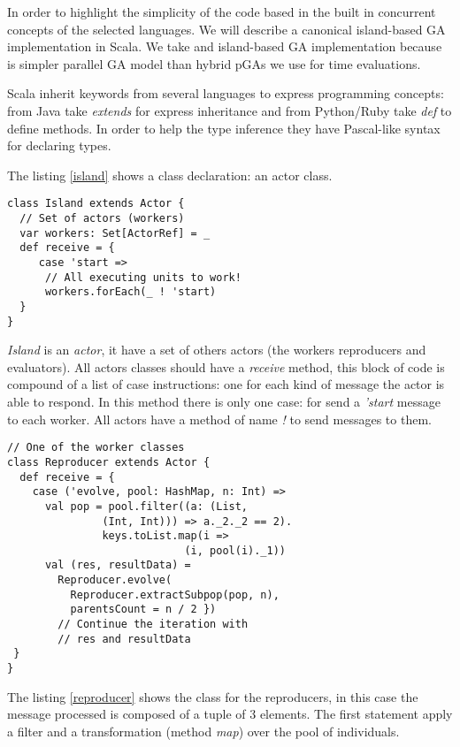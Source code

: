 In order to highlight the simplicity of the code based in the built in concurrent concepts of the selected languages. We will describe a canonical island-based GA implementation in Scala. We take and island-based GA implementation because is simpler parallel GA model than  hybrid pGAs we use for time evaluations.

Scala inherit keywords from several languages to express programming concepts: from Java take {\em extends} for express inheritance and from Python/Ruby take {\em def} to define methods. In order to help the type inference they have Pascal-like syntax for declaring types.

The listing \ref{island} shows a class declaration: an actor class.

\begin{lstlisting}[frame=none]
class Island extends Actor {
  // Set of actors (workers)
  var workers: Set[ActorRef] = _
  def receive = {
     case 'start =>
      // All executing units to work!
      workers.forEach(_ ! 'start)
  }
}
\end{lstlisting}

{\em Island} is an {\em actor}, it have a set of others actors (the workers reproducers and evaluators). All actors classes should have a {\em receive} method, this block of code is compound of a list of case instructions: one for each kind of message the actor is able to respond. In this method there is only one case: for send a {\em 'start} message to each worker. All actors have a method of name {\em !} to send messages to them.

\begin{lstlisting}[frame=none]
// One of the worker classes
class Reproducer extends Actor {
  def receive = {
    case ('evolve, pool: HashMap, n: Int) =>
      val pop = pool.filter((a: (List,
               (Int, Int))) => a._2._2 == 2).
               keys.toList.map(i =>
                            (i, pool(i)._1))
      val (res, resultData) =
        Reproducer.evolve(
          Reproducer.extractSubpop(pop, n),
          parentsCount = n / 2 })
        // Continue the iteration with
        // res and resultData
 }
}
\end{lstlisting}

The listing \ref{reproducer} shows the class for the reproducers, in this case the message processed is composed of a tuple of 3 elements. The first statement apply a filter and a transformation (method {\em map}) over the pool of individuals.

